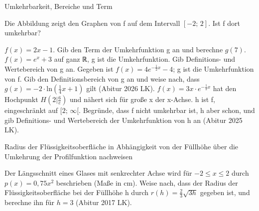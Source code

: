 \setcounter{aufgabe}{7}

\begin{aufgabe}{Umkehrbarkeit, Bereiche und Term}
\begin{teile}
\teil Die Abbildung zeigt den Graphen von f auf dem Intervall $[-2;\, 2]$. Ist f dort umkehrbar?  \\ 

\begin{ksys}[xmin=-3,xmax=3,ymin=-4,ymax=4,ablesen]  \end{ksys}
\teil $f(x) = 2x - 1$. Gib den Term der Umkehrfunktion g an und berechne $g(7)$.
\teil $f(x) = e^x + 3$ auf ganz ℝ, g ist die Umkehrfunktion. Gib Definitions- und Wertebereich von g an.
\teil Gegeben ist $f(x) = 4e^{-\frac{1}{2}x} - 4$; g ist die Umkehrfunktion von f. Gib den Definitionsbereich von g an und weise nach, dass $g(x) = -2 \cdot \mathrm{ln}\left(\frac{1}{4}x + 1\right)$ gilt \hfill (Abitur 2026 LK).
\teil $f(x) = 3x \cdot e^{-\frac{1}{2}x}$ hat den Hochpunkt $H(2 | \tfrac{6}{e})$ und nähert sich für große x der x-Achse. h ist f, eingeschränkt auf $[2;\, \infty[$. Begründe, dass f nicht umkehrbar ist, h aber schon, und gib Definitions- und Wertebereich der Umkehrfunktion von h an \hfill (Abitur 2025 LK).
\end{teile}
\end{aufgabe}

\begin{aufgabe}{Radius der Flüssigkeitsoberfläche in Abhängigkeit von der Füllhöhe über die Umkehrung der Profilfunktion nachweisen}
\begin{teile}
\teil Der Längsschnitt eines Glases mit senkrechter Achse wird für $-2 \le x \le 2$ durch $p(x) = 0{,}75x^2$ beschrieben (Maße in cm). Weise nach, dass der Radius der Flüssigkeitsoberfläche bei der Füllhöhe h durch $r(h) = \frac{2}{3}\sqrt{3h}$ gegeben ist, und berechne ihn für $h = 3$ \hfill (Abitur 2017 LK).
\end{teile}
\end{aufgabe}

